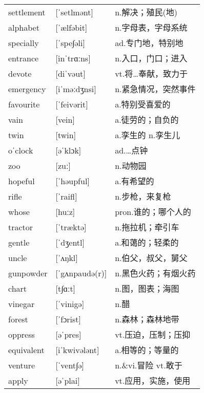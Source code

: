 \documentclass[a4paper]{article}
\begin{document}
\section{}
\begin{tabular}{l l l}

settlement & [ˈsetlmənt] & n.解决；殖民(地) \\
alphabet & [ˈælfəbit] & n.字母表，字母系统 \\
specially & [ˈspe∫əli] & ad.专门地，特别地 \\
entrance & [inˈtrɑːns] & n.入口，门口；进入 \\
devote & [diˈvəut] & vt.将…奉献，致力于 \\
emergency & [iˈməːdʒnsi] & n.紧急情况，突然事件 \\
favourite & [ˈfeivərit] & a.特别受喜爱的 \\
vain & [vein] & a.徒劳的；自负的 \\
twin & [twin] & a.孪生的 n.孪生儿 \\
oˈclock & [əˈklɔk] & ad.…点钟 \\
zoo & [zuː] & n.动物园 \\
hopeful & [ˈhəupful] & a.有希望的 \\
rifle & [ˈraifl] & n.步枪，来复枪 \\
whose & [huːz] & pron.谁的；哪个人的 \\
tractor & [ˈtræktə] & n.拖拉机；牵引车 \\
gentle & [ˈdʒentl] & a.和蔼的；轻柔的 \\
uncle & [ˈʌŋkl] & n.伯父，叔父，舅父 \\
gunpowder & [ˈgʌnpaudə(r)] & n.黑色火药；有烟火药 \\
chart & [t∫ɑːt] & n.图，图表；海图 \\
vinegar & [ˈvinigə] & n.醋 \\
forest & [ˈfɔrist] & n.森林；森林地带 \\
oppress & [əˈpres] & vt.压迫，压制；压抑 \\
equivalent & [iˈkwivələnt] & a.相等的；等量的 \\
venture & [ˈvent∫ə] & n.\&vi.冒险 vt.敢于 \\
apply & [əˈplai] & vt.应用，实施，使用 \\

\end{tabular}
\end{document}
